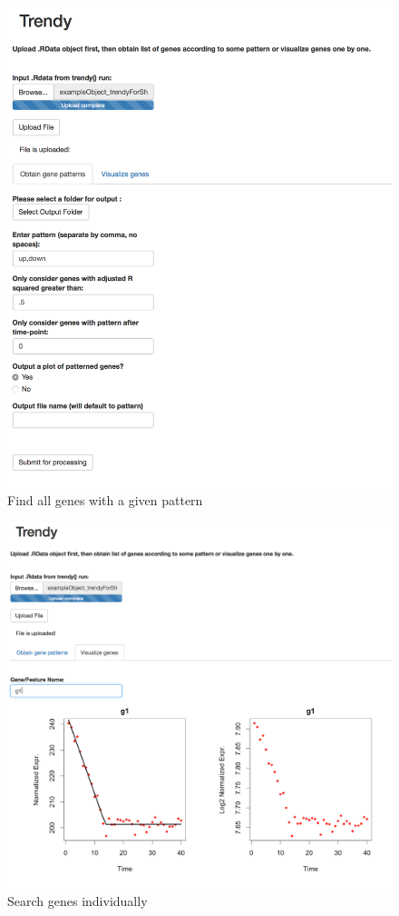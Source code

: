 \documentclass{article}\usepackage[]{graphicx}\usepackage[usenames,dvipsnames]{color}
\begin{document}
\begin{figure}[H]
\centering
\includegraphics[width=1\textwidth]{Shing_allGenePat.png}
\caption{Find all genes with a given pattern}
\end{figure}


\begin{figure}[H]
\centering
\includegraphics[width=1\textwidth]{Shiny_geneSearch.png}
\caption{Search genes individually}
\end{figure}
\end{document}
